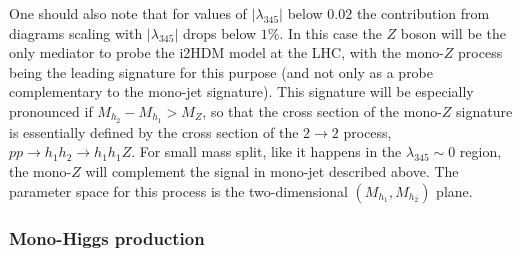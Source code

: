\documentclass[12pt,a4paper]{article}
\begin{document}
One should also note that for values of $|\lambda_{345}|$
below $0.02$ the contribution from diagrams scaling with $|\lambda_{345}|$
drops below $1\%$. In this case the
$Z$ boson will be the only mediator to probe the i2HDM model at the LHC,
with the mono-$Z$ process being the leading signature
for this purpose (and not only as a probe complementary to the mono-jet signature). 
This signature will be especially pronounced if $M_{h_2}-M_{h_1} > M_Z$,
so that the cross section of the mono-$Z$ signature
is essentially defined by the cross section of the $2 \to 2$ process,
$pp\to h_1 h_2 \to h_1 h_1 Z$.
For small mass split, like it happens in the $\lambda_{345} \sim 0$ region, the mono-$Z$ will complement the signal in mono-jet described above.
The parameter space for this process is
the two-dimensional $(M_{h_1},M_{h_2})$ plane.

\subsubsection{Mono-Higgs production}
\end{document}
